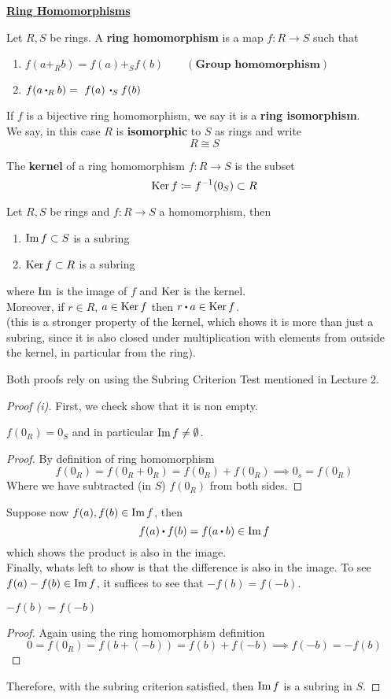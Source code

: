 \documentclass[../Main.tex]{subfiles}
\begin{document}
\underline{\textbf{\Large{Ring Homomorphisms}}}
\begin{dfn}[title = Ring homomorphism and isomorphism]
	Let $R,S$ be rings. A \textbf{ring homomorphism} is a map $f: R \to S$ such that
	\begin{enumerate}
		\item $f(a+_R b) = f(a) +_S f(b) \qquad (\textbf{Group homomorphism})$
		\item $f(a\rdot_R b) = \,\,f(a)\,\rdot_S f(b)$
	\end{enumerate}
	If $f$ is a bijective ring homomorphism, we say it is a \textbf{ring isomorphism}.\\
	We say, in this case $R$ is \textbf{isomorphic} to $S$ as rings and write
	\[R \cong S\]
\end{dfn}
\begin{dfn}
	The \textbf{kernel} of a ring homomorphism $f: R\to S$ is the subset
	\[\operatorname{Ker} f \coloneqq f^{-1}(0_S)\subset R\]
\end{dfn}
\begin{prop}
	Let $R,S$ be rings and $f: R \to S$ a homomorphism, then
	\begin{enumerate}
		\item $\operatorname{Im} f \subset S$ is a subring
		\item $\operatorname{Ker} f \subset R$ is a subring
	\end{enumerate}
	where $\operatorname{Im}$ is the image of $f$ and $\operatorname{Ker}$ is the kernel.\\
	Moreover, if $r\in R$, $a\in \operatorname{Ker} f$ then $r\rdot a \in \Ker f$.\\
	 (this is a stronger property of the kernel, which shows it is more than just a subring, since it is also closed under multiplication with elements from outside the kernel, in particular from the ring).
\end{prop}
Both proofs rely on using the Subring Criterion Test mentioned in Lecture 2.
\begin{proof}[Proof (i)]First, we check show that it is non empty.
	 \begin{claim}
		$f(0_R) = 0_S$ and in particular $\operatorname{Im} f \ne \emptyset$.
		\begin{proof}
			By definition of ring homomorphism
			\[f(0_R)=f(0_R+0_R)=f(0_R)+f(0_R) \implies 0_s = f(0_R)\]
			Where we have subtracted (in $S$) $f(0_R)$ from both sides.
		\end{proof}
	\end{claim}
	Suppose now $f(a), f(b) \in \operatorname{Im} f$, then
	\[f(a)\rdot f(b) = f(a\rdot b) \in \Img f\]
	which shows the product is also in the image.\\
	Finally, whats left to show is that the difference is also in the image.
	To see $f(a)-f(b) \in \operatorname{Im} f$, it suffices to see that $-f(b)=f(-b)$.\\
	\begin{claim}
		$-f(b)=f(-b)$
	\end{claim}
	\begin{proof}
		Again using the ring homomorphism definition
		\[0=f(0_R)=f(b+(-b))=f(b)+f(-b) \implies f(-b)=-f(b)\]
	\end{proof}
	Therefore, with the subring criterion satisfied, then $\operatorname{Im} f$ is a subring in $S$.
	\end{proof}
\end{document}
